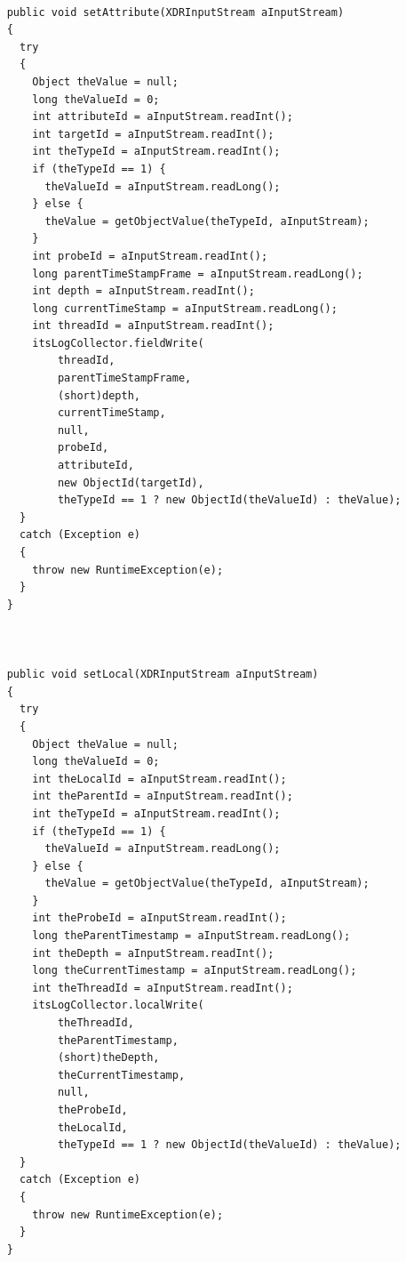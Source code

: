 \documentclass[12pt,legalpaper]{report}
\begin{document}
\begin{singlespace}
\begin{lstlisting}
		
    public void setAttribute(XDRInputStream aInputStream)
    {
      try
      {
        Object theValue = null;
        long theValueId = 0;
        int attributeId = aInputStream.readInt();
        int targetId = aInputStream.readInt();
        int theTypeId = aInputStream.readInt();
        if (theTypeId == 1) {
          theValueId = aInputStream.readLong();
        } else {
          theValue = getObjectValue(theTypeId, aInputStream);
        }
        int probeId = aInputStream.readInt();
        long parentTimeStampFrame = aInputStream.readLong();
        int depth = aInputStream.readInt();
        long currentTimeStamp = aInputStream.readLong();
        int threadId = aInputStream.readInt();
        itsLogCollector.fieldWrite(
            threadId, 
            parentTimeStampFrame, 
            (short)depth, 
            currentTimeStamp, 
            null, 
            probeId, 
            attributeId, 
            new ObjectId(targetId), 
            theTypeId == 1 ? new ObjectId(theValueId) : theValue);
      }
      catch (Exception e)
      {
        throw new RuntimeException(e);
      }			
    }

		
		
    public void setLocal(XDRInputStream aInputStream)
    {
      try
      {
        Object theValue = null;
        long theValueId = 0;
        int theLocalId = aInputStream.readInt();
        int theParentId = aInputStream.readInt();
        int theTypeId = aInputStream.readInt();
        if (theTypeId == 1) {
          theValueId = aInputStream.readLong();
        } else {
          theValue = getObjectValue(theTypeId, aInputStream);
        }
        int theProbeId = aInputStream.readInt();
        long theParentTimestamp = aInputStream.readLong();
        int theDepth = aInputStream.readInt();
        long theCurrentTimestamp = aInputStream.readLong();
        int theThreadId = aInputStream.readInt();				
        itsLogCollector.localWrite(
            theThreadId,
            theParentTimestamp, 
            (short)theDepth, 
            theCurrentTimestamp, 
            null, 
            theProbeId, 
            theLocalId, 
            theTypeId == 1 ? new ObjectId(theValueId) : theValue);
      }
      catch (Exception e)
      {
        throw new RuntimeException(e);
      }			
    }


\end{lstlisting}
\end{singlespace}
\end{document}
